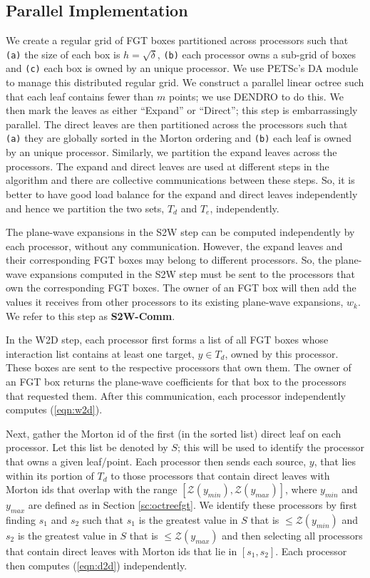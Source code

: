 
\subsection{Parallel Implementation}
\label{sc:parallelnufgt}

We create a regular grid of FGT boxes partitioned across processors such that 
 {\tt{(a)}} the size of each box is $h = \sqrt{\delta}$, {\tt{(b)}} each processor owns a sub-grid of boxes and
 {\tt{(c)}} each box is owned by an unique processor.  We use PETSc's \cite{petsc-user-ref, petsc-home-page} DA
 module to manage this distributed regular grid. We construct a parallel linear octree such that each leaf
 contains fewer than $m$ points; we use DENDRO \cite{dendro} to do this. We then mark the leaves as either
 ``Expand'' or ``Direct''; this step is embarrassingly parallel. The direct leaves are then partitioned across 
 the processors such that {\tt{(a)}} they are globally sorted in the Morton ordering and {\tt{(b)}} each leaf 
 is owned by an unique processor. Similarly, we partition the expand leaves across the processors. The expand
 and direct leaves are used at different steps in the algorithm and there are collective communications between
 these steps. So, it is better to have good load balance for the expand and direct leaves independently and hence
 we partition the two sets, $T_d$ and $T_e$, independently.

The plane-wave expansions in the S2W step can be computed independently by each processor, without any communication.
However, the expand leaves and their corresponding FGT boxes may belong to different processors. So, the plane-wave 
expansions computed in the S2W step must be sent to the processors that own the corresponding FGT boxes. The owner of
an FGT box will then add the values it receives from other processors to its existing plane-wave expansions, $w_k$. We 
refer to this step as {\textbf{S2W-Comm}}.

In the W2D step, each processor first forms a list of all FGT boxes whose interaction list contains at least one 
target, $y \in T_d$, owned by this processor. These boxes are sent to the respective processors that own them. The
owner of an FGT box returns the plane-wave coefficients for that box to the processors that requested them. After this
communication, each processor independently computes (\ref{eqn:w2d}).

Next, gather the Morton id of the first (in the sorted list) direct leaf on each processor. Let this list
be denoted by $S$; this will be used to identify the processor that owns a given leaf/point. Each 
processor then sends each source, $y$, that lies within its portion of $T_d$ to those processors 
that contain direct leaves with Morton ids that overlap with the range $[\mathcal{Z}(y_{min}), \mathcal{Z}(y_{max})]$, where
 $y_{min}$ and $y_{max}$ are defined as in Section \ref{sc:octreefgt}. We identify these processors 
 by first finding $s_1$ and $s_2$ such that $s_1$ is the greatest value in $S$ that is $\leq \mathcal{Z}(y_{min})$ and 
 $s_2$ is the greatest value in $S$ that is $\leq \mathcal{Z}(y_{max})$ and then selecting all processors that contain
 direct leaves with Morton ids that lie in $[s_1, s_2]$. Each processor then computes (\ref{eqn:d2d}) independently.


